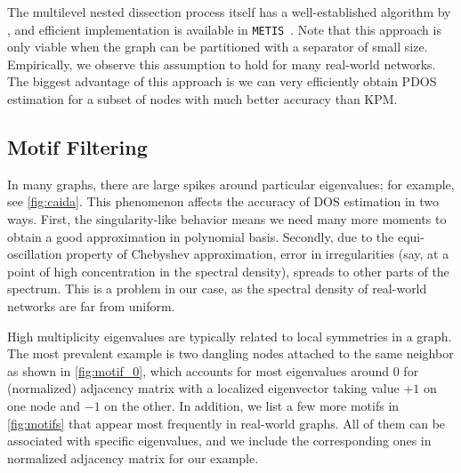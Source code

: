 The multilevel nested dissection process itself has a well-established
algorithm by \citeauthor{karypis1998fast}, and efficient implementation is
available in \texttt{METIS}~\cite{karypis1998fast}. Note that this approach is
only viable when the graph can be partitioned with a separator of small size.
Empirically, we observe this assumption to hold for many real-world networks.
The biggest advantage of this approach is we can very efficiently obtain PDOS
estimation for a subset of nodes with much better accuracy than KPM.


\subsection{Motif Filtering}

In many graphs, there are large spikes around particular eigenvalues; for
example, see \cref{fig:caida}. This phenomenon affects the accuracy of DOS
estimation in two ways. First, the singularity-like behavior means we need many
more moments to obtain a good approximation in polynomial basis. Secondly, due
to the equi-oscillation property of Chebyshev approximation, error in
irregularities (say, at a point of high concentration in the spectral density),
spreads to other parts of the spectrum. This is a problem in our case, as the
spectral density of real-world networks are far from uniform.

High multiplicity eigenvalues are typically related to local symmetries in a
graph. The most prevalent example is two dangling nodes attached to the same
neighbor as shown in \cref{fig:motif_0}, which accounts for most eigenvalues
around $0$ for (normalized) adjacency matrix with a localized eigenvector taking
value $+1$ on one node and $-1$ on the other. In addition, we list a few more
motifs in \cref{fig:motifs} that appear most frequently in real-world graphs.
All of them can be associated with specific eigenvalues, and we include the
corresponding ones in normalized adjacency matrix for our example.

